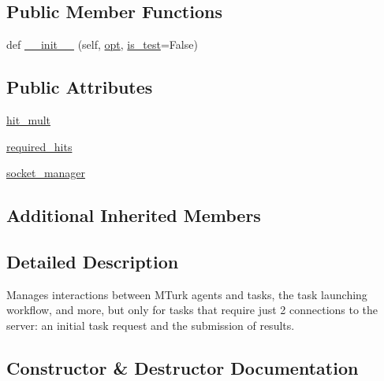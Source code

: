 \subsection*{Public Member Functions}
\begin{DoxyCompactItemize}
\item 
def \hyperlink{classparlai_1_1mturk_1_1core_1_1mturk__manager_1_1StaticMTurkManager_ab5bd9c520d5aefcb52031fb8c0d2f4bc}{\+\_\+\+\_\+init\+\_\+\+\_\+} (self, \hyperlink{classparlai_1_1mturk_1_1core_1_1mturk__manager_1_1MTurkManager_a1167cb8359db58221b2843554731cf1b}{opt}, \hyperlink{classparlai_1_1mturk_1_1core_1_1mturk__manager_1_1MTurkManager_aba2c8855ba4baadd54a42a834aaf75bd}{is\+\_\+test}=False)
\end{DoxyCompactItemize}
\subsection*{Public Attributes}
\begin{DoxyCompactItemize}
\item 
\hyperlink{classparlai_1_1mturk_1_1core_1_1mturk__manager_1_1StaticMTurkManager_ae5ea8ccfb26e3ea55357bf4f34edef27}{hit\+\_\+mult}
\item 
\hyperlink{classparlai_1_1mturk_1_1core_1_1mturk__manager_1_1StaticMTurkManager_aa41b3c50a7fe1b11a022b8d6877b5e65}{required\+\_\+hits}
\item 
\hyperlink{classparlai_1_1mturk_1_1core_1_1mturk__manager_1_1StaticMTurkManager_ad705fb400223ca7f2e9c9b2026a04d07}{socket\+\_\+manager}
\end{DoxyCompactItemize}
\subsection*{Additional Inherited Members}


\subsection{Detailed Description}
\begin{DoxyVerb}Manages interactions between MTurk agents and tasks, the task launching workflow,
and more, but only for tasks that require just 2 connections to the server: an
initial task request and the submission of results.
\end{DoxyVerb}
 

\subsection{Constructor \& Destructor Documentation}
\mbox{\label{classparlai_1_1mturk_1_1core_1_1mturk__manager_1_1StaticMTurkManager_ab5bd9c520d5aefcb52031fb8c0d2f4bc}} 
